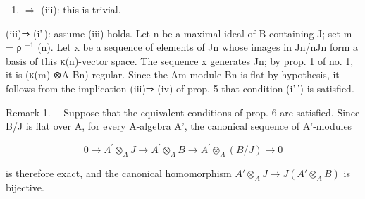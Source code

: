 \begin{enumerate}
\def\labelenumi{(\roman{enumi})}
\setcounter{enumi}{1}
\tightlist
\item
  \(\Rightarrow\) (iii): this is trivial.
\end{enumerate}

(iii)⇒ (i'\,): assume (iii) holds. Let n be a maximal ideal of B containing J; set m = ρ \(^{-1}\) (n). Let x be a sequence of elements of Jn whose images in Jn/nJn form a basis of this κ(n)-vector space. The sequence x generates Jn; by prop. 1 of no. 1, it is (κ(m) ⊗A Bn)-regular. Since the Am-module Bn is flat by hypothesis, it follows from the implication (iii)⇒ (iv) of prop. 5 that condition (i'\,') is satisfied.

Remark 1.--- Suppose that the equivalent conditions of prop. 6 are satisfied. Since B/J is flat over A, for every A-algebra A', the canonical sequence of A'-modules

\[
0 \rightarrow \Lambda^ {\prime} \otimes_ {A} J \longrightarrow A ^ {\prime} \otimes_ {A} B \longrightarrow A ^ {\prime} \otimes_ {A} (B / J) \rightarrow 0
\]

is therefore exact, and the canonical homomorphism \(A'\otimes_A J \longrightarrow J(A'\otimes_A B)\) is bijective.

